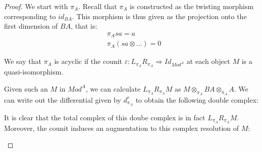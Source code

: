 \documentclass[../thesis.tex]{subfiles}
\begin{document}
            \begin{proof}
                We start with $\pi_A$. Recall that $\pi_A$ is constructed as the twisting morphism corresponding to $id_{BA}$. This morphism is thus given as the projection onto the first dimension of $BA$, that is:
                \begin{align*}
                    & \pi_A{sa} = a \\
                    & \pi_A(sa\otimes ...) = 0
                \end{align*}

                We say that $\pi_A$ is acyclic if the counit $\varepsilon : L_{\pi_A}R_{\pi_A} \Rightarrow Id_{Mod^A}$ at each object $M$ is a quasi-isomorphism.

                Given such an $M$ in $Mod^A$, we can calculate $L_{\pi_A}R_{\pi_A}M$ as $M\otimes_{\pi_A}BA\otimes_{\pi_A}A$. We can write out the differential given by $d^r_{\pi_A}$ to obtain the following double complex:
                \begin{center}
                \end{center}
                It is clear that the total complex of this doube complex is in fact $L_{\pi_A}R_{\pi_A}M$. Moreover, the counit induces an augmentation to this complex resolution of $M$:
                \begin{center}
                \end{center}

            \end{proof}
\end{document}

